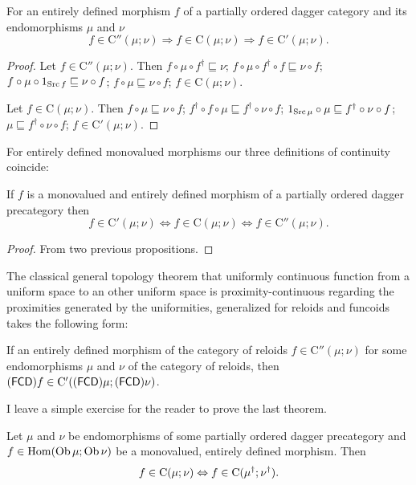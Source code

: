\begin{prop}
For an entirely defined morphism $f$ of a partially ordered dagger
category and its endomorphisms $\mu$ and $\nu$
\[
f\in\mathrm{C}''(\mu;\nu)\Rightarrow f\in\mathrm{C}(\mu;\nu)\Rightarrow f\in\mathrm{C}'(\mu;\nu).
\]
\end{prop}
\begin{proof}
Let $f\in\mathrm{C}''(\mu;\nu)$. Then $f\circ\mu\circ f^{\dagger}\sqsubseteq\nu$;
$f\circ\mu\circ f^{\dagger}\circ f\sqsubseteq\nu\circ f$; $f\circ\mu\circ1_{\operatorname{Src} f}\sqsubseteq\nu\circ f$;
$f\circ\mu\sqsubseteq\nu\circ f$; $f\in\mathrm{C}(\mu;\nu)$.

Let $f\in\mathrm{C}(\mu;\nu)$. Then $f\circ\mu\sqsubseteq\nu\circ f$;
$f^{\dagger}\circ f\circ\mu\sqsubseteq f^{\dagger}\circ\nu\circ f$;
$1_{\operatorname{Src}\mu}\circ\mu\sqsubseteq f^{\dagger}\circ\nu\circ f$; $\mu\sqsubseteq f^{\dagger}\circ\nu\circ f$;
$f\in\mathrm{C}'(\mu;\nu)$.
\end{proof}
For entirely defined monovalued morphisms our three definitions of
continuity coincide:
\begin{thm}
If $f$ is a monovalued and entirely defined morphism of a partially
ordered dagger precategory then
\[
f\in\mathrm{C}'(\mu;\nu)\Leftrightarrow f\in\mathrm{C}(\mu;\nu)\Leftrightarrow f\in\mathrm{C}''(\mu;\nu).
\]
\end{thm}
\begin{proof}
From two previous propositions.
\end{proof}
The classical general topology theorem that uniformly continuous function
from a uniform space to an other uniform space is proximity-continuous
regarding the proximities generated by the uniformities, generalized
for reloids and funcoids takes the following form:
\begin{thm}
If an entirely defined morphism of the category of reloids $f\in\mathrm{C}''(\mu;\nu)$
for some endomorphisms $\mu$ and $\nu$ of the category of reloids,
then $\mathsf{(\mathsf{FCD})}f\in\mathrm{C}'((\mathsf{FCD})\mu;(\mathsf{FCD})\nu)$.\end{thm}
\begin{xca}
I leave a simple exercise for the reader to prove the last theorem.
\end{xca}

\begin{thm}
Let $\mu$ and $\nu$ be endomorphisms of some partially ordered dagger precategory and
$f\in\operatorname{Hom}(\operatorname{Ob}\mu;\operatorname{Ob}\nu)$ be a monovalued, entirely defined morphism. Then
\[ f\in\mathrm{C}(\mu;\nu)\Leftrightarrow f\in\mathrm{C}(\mu^{\dagger};\nu^{\dagger}). \]
\end{thm}

